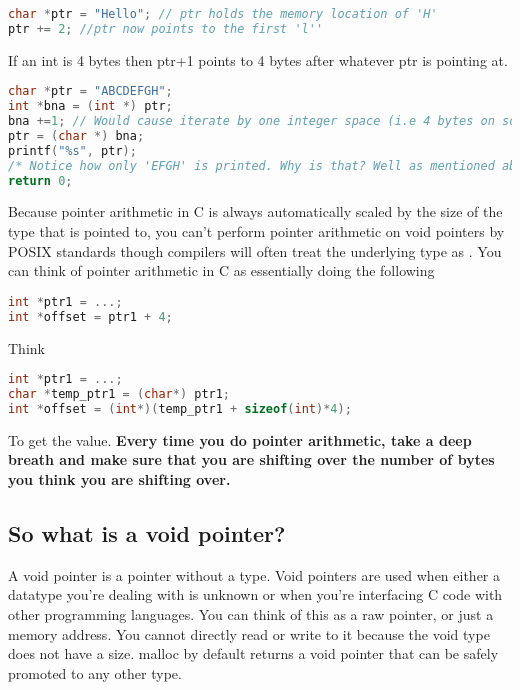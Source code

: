 \begin{lstlisting}[language=C]
char *ptr = "Hello"; // ptr holds the memory location of 'H'
ptr += 2; //ptr now points to the first 'l''
\end{lstlisting}

If an int is 4 bytes then ptr+1 points to 4 bytes after whatever ptr is pointing at.

\begin{lstlisting}[language=C]
char *ptr = "ABCDEFGH";
int *bna = (int *) ptr;
bna +=1; // Would cause iterate by one integer space (i.e 4 bytes on some systems)
ptr = (char *) bna;
printf("%s", ptr);
/* Notice how only 'EFGH' is printed. Why is that? Well as mentioned above, when performing 'bna+=1' we are increasing the **integer** pointer by 1, (translates to 4 bytes on most systems) which is equivalent to 4 characters (each character is only 1 byte)*/
return 0;
\end{lstlisting}

Because pointer arithmetic in C is always automatically scaled by the size of the type that is pointed to, you can't perform pointer
arithmetic on void pointers by POSIX standards though compilers will often treat the underlying type as .
You can think of pointer arithmetic in C as essentially doing the
following

\begin{lstlisting}[language=C]
int *ptr1 = ...;
int *offset = ptr1 + 4;
\end{lstlisting}

Think

\begin{lstlisting}[language=C]
int *ptr1 = ...;
char *temp_ptr1 = (char*) ptr1;
int *offset = (int*)(temp_ptr1 + sizeof(int)*4);
\end{lstlisting}

To get the value. \textbf{Every time you do pointer arithmetic, take a deep breath and make sure that you are shifting over the number of bytes you think you are shifting over.}

\subsection{So what is a void pointer?}

A void pointer is a pointer without a type.
Void pointers are used when either a datatype you're dealing with is unknown or when you're interfacing C code with other programming languages.
You can think of this as a raw pointer, or just a memory address.
You cannot directly read or write to it because the void type does not have a size.
malloc by default returns a void pointer that can be safely promoted to any other type.

